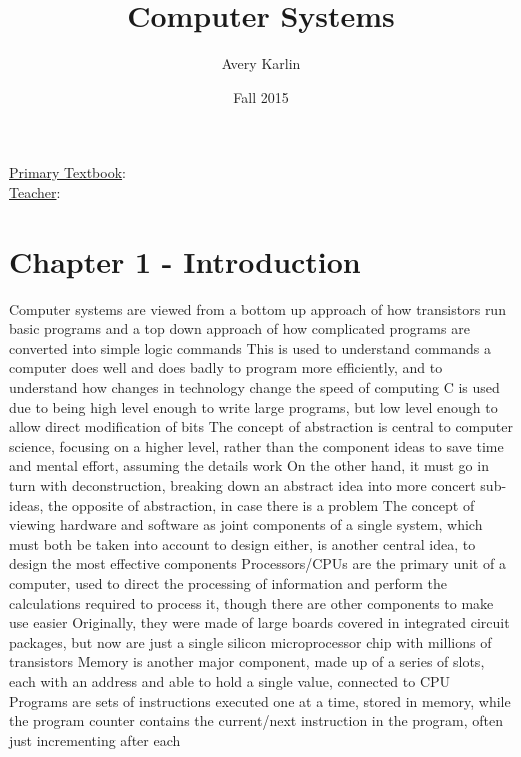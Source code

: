 \documentclass[11 pt, twoside]{article}
\newenvironment{outline*}
{
	\begin{outline}[enumerate]
	}
	{\end{outline}
}
\begin{document}
\title{Computer Systems}
\author{Avery Karlin}
\date{Fall 2015}
\newcommand{\textbook}{}
\newcommand{\teacher}{}

\maketitle
\newpage
\hypertarget{content}{\tableofcontents}
\vspace{11pt}
\noindent
\underline{Primary Textbook}: \textbook\\
\underline{Teacher}: \teacher
\newpage

\section{Chapter 1 - Introduction}
\begin{outline*}
\1 Computer systems are viewed from a bottom up approach of how transistors run basic programs and a top down approach of how complicated programs are converted into simple logic commands
\2 This is used to understand commands a computer does well and does badly to program more efficiently, and to understand how changes in technology change the speed of computing
\2 C is used due to being high level enough to write large programs, but low level enough to allow direct modification of bits
\1 The concept of abstraction is central to computer science, focusing on a higher level, rather than the component ideas to save time and mental effort, assuming the details work
\2 On the other hand, it must go in turn with deconstruction, breaking down an abstract idea into more concert sub-ideas, the opposite of abstraction, in case there is a problem
\1 The concept of viewing hardware and software as joint components of a single system, which must both be taken into account to design either, is another central idea, to design the most effective components
\1 Processors/CPUs are the primary unit of a computer, used to direct the processing of information and perform the calculations required to process it, though there are other components to make use easier
\2 Originally, they were made of large boards covered in integrated circuit packages, but now are just a single silicon microprocessor chip with millions of transistors
\2 Memory is another major component, made up of a series of slots, each with an address and able to hold a single value, connected to CPU
\2 Programs are sets of instructions executed one at a time, stored in memory, while the program counter contains the current/next instruction in the program, often just incrementing after each

\end{outline*}
\end{document}
